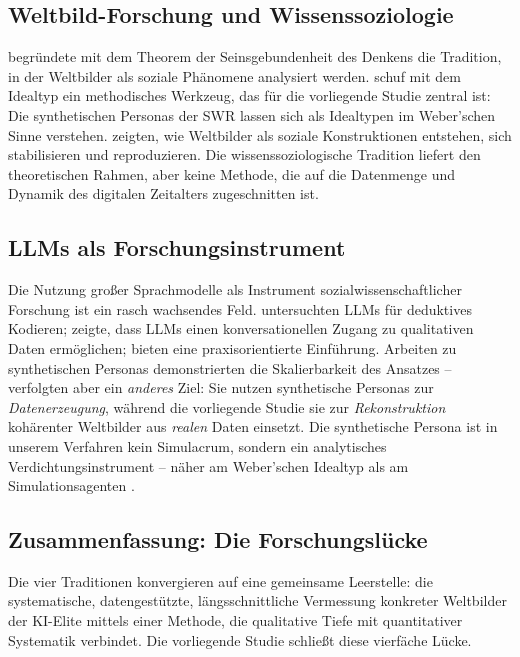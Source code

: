 \documentclass[12pt,a4paper]{article}
\begin{document}
\subsection{Weltbild-Forschung und Wissenssoziologie}
\label{sec:forschungsstand:wissenssoziologie}

\citet{Mannheim1929} begr\"undete mit dem Theorem der \glqq Seinsgebundenheit des Denkens\grqq{} die Tradition, in der Weltbilder als soziale Ph\"anomene analysiert werden. \citet{Weber1904} schuf mit dem Idealtyp ein methodisches Werkzeug, das f\"ur die vorliegende Studie zentral ist: Die synthetischen Personas der SWR lassen sich als Idealtypen im Weber'schen Sinne verstehen. \citet{BergerLuckmann1966} zeigten, wie Weltbilder als soziale Konstruktionen entstehen, sich stabilisieren und reproduzieren. Die wissenssoziologische Tradition liefert den theoretischen Rahmen, aber keine Methode, die auf die Datenmenge und Dynamik des digitalen Zeitalters zugeschnitten ist.


\subsection{LLMs als Forschungsinstrument}
\label{sec:forschungsstand:llm}

Die Nutzung gro\ss{}er Sprachmodelle als Instrument sozialwissenschaftlicher Forschung ist ein rasch wachsendes Feld. \citet{Tai2024} untersuchten LLMs f\"ur deduktives Kodieren; \citet{Hayes2025} zeigte, dass LLMs einen konversationellen Zugang zu qualitativen Daten erm\"oglichen; \citet{NicmanisSpurrier2025} bieten eine praxisorientierte Einf\"uhrung. Arbeiten zu synthetischen Personas \citep{Ge2024} demonstrierten die Skalierbarkeit des Ansatzes -- verfolgten aber ein \emph{anderes} Ziel: Sie nutzen synthetische Personas zur \emph{Datenerzeugung}, w\"ahrend die vorliegende Studie sie zur \emph{Rekonstruktion} koh\"arenter Weltbilder aus \emph{realen} Daten einsetzt. Die synthetische Persona ist in unserem Verfahren kein Simulacrum, sondern ein analytisches Verdichtungsinstrument -- n\"aher am Weber'schen Idealtyp als am Simulationsagenten \citep[vgl.][]{Booth1961, NgRussell2000, JaraEttinger2019}.


\subsection{Zusammenfassung: Die Forschungsl\"ucke}
\label{sec:forschungsstand:luecke}

Die vier Traditionen konvergieren auf eine gemeinsame Leerstelle: die systematische, datengest\"utzte, l\"angsschnittliche Vermessung konkreter Weltbilder der KI-Elite mittels einer Methode, die qualitative Tiefe mit quantitativer Systematik verbindet. Die vorliegende Studie schlie\ss{}t diese vierf\"ache L\"ucke.
\end{document}
